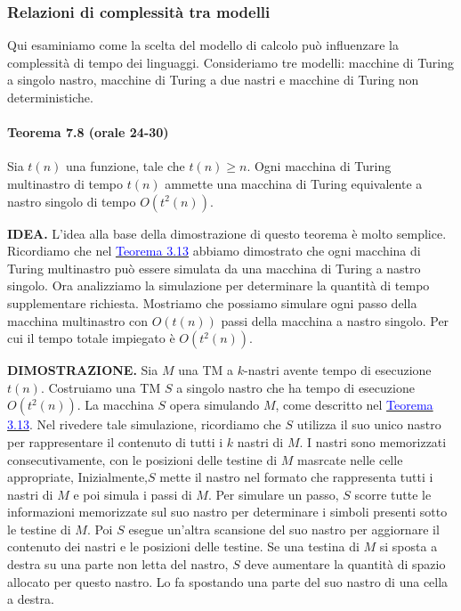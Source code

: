 \documentclass{article}
\begin{document}
\subsubsection{Relazioni di complessità tra modelli}
Qui esaminiamo come la scelta del modello di calcolo può influenzare la complessità di tempo dei linguaggi.
Consideriamo tre modelli: macchine di Turing a singolo nastro, macchine di Turing a due nastri e macchine di Turing non deterministiche.
\vspace{1em}
\paragraph{Teorema 7.8 (orale 24-30)}
\label{teorema-7.8}
\text{}
\newline
\begin{tcolorbox}[colback=yellow!10!white, colframe=yellow!50!black, title=Teorema 7.8]
    Sia $t(n)$ una funzione, tale che $t(n) \geq n$.
    Ogni macchina di Turing multinastro di tempo $t(n)$ ammette una macchina di Turing equivalente a nastro singolo di tempo $O(t^2(n))$.
\end{tcolorbox}

\hbox{\textbf{IDEA.}}
L'idea alla base della dimostrazione di questo teorema è molto semplice.
Ricordiamo che nel \hyperref[teorema-3.13]{\textcolor{blue}{Teorema 3.13}} abbiamo dimostrato che ogni macchina di Turing multinastro può essere simulata da una macchina di Turing a nastro singolo.
Ora analizziamo la simulazione per determinare la quantità di tempo supplementare richiesta.
Mostriamo che possiamo simulare ogni passo della macchina multinastro con $O(t(n))$ passi della macchina a nastro singolo.
\newline
Per cui il tempo totale impiegato è $O(t^2(n))$.
\vspace{1em}

\hbox{\textbf{DIMOSTRAZIONE.}}
Sia $M$ una TM a $k$-nastri avente tempo di esecuzione $t(n)$.
Costruiamo una TM $S$ a singolo nastro che ha tempo di esecuzione $O(t^2(n))$.
La macchina $S$ opera simulando $M$, come descritto nel \hyperref[teorema-3.13]{\textcolor{blue}{Teorema 3.13}}.
Nel rivedere tale simulazione, ricordiamo che $S$ utilizza il suo unico nastro per rappresentare il contenuto di tutti i $k$ nastri di $M$.
I nastri sono memorizzati consecutivamente, con le posizioni delle testine di $M$ masrcate nelle celle appropriate,
Inizialmente,$S$ mette il nastro nel formato che rappresenta tutti i nastri di $M$ e poi simula i passi di $M$.
Per simulare un passo, $S$ scorre tutte le informazioni memorizzate sul suo nastro per determinare i simboli presenti sotto le testine di $M$.
Poi $S$ esegue un'altra scansione del suo nastro per aggiornare il contenuto dei nastri e le posizioni delle testine.
Se una testina di $M$ si sposta a destra su una parte non letta del nastro, $S$ deve aumentare la quantità di spazio allocato per questo nastro.
Lo fa spostando una parte del suo nastro di una cella a destra.
\end{document}

